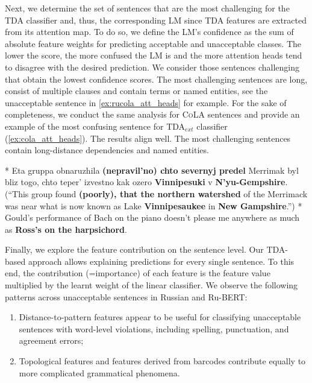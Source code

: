 \documentclass[11pt]{article}
\begin{document}
Next, we determine the set of sentences that are the most challenging for the TDA classifier and, thus, the corresponding LM since TDA features are extracted from its attention map. 
To do so, we define the LM's confidence as the sum of absolute feature weights for predicting acceptable and unacceptable classes. The lower the score, the more confused the LM is and the more attention heads tend to disagree with the desired prediction.  
We consider those sentences challenging that obtain the lowest confidence scores. 
The most challenging sentences are long, consist of multiple clauses and contain terms or named entities, see the unacceptable sentence in \ref{ex:rucola_att_heads} for example.
For the sake of completeness, we conduct the same analysis for \textsc{CoLA} sentences and provide an example of the most confusing sentence for TDA$_{ext}$ classifier (\ref{ex:cola_att_heads}). The results align well. The most challenging sentences contain long-distance dependencies and named entities.
\begin{exe}
\ex \label{ex:rucola_att_heads} * Eta gruppa obnaruzhila \textbf{(nepravil'no) chto severnyj predel} Merrimak byl bliz togo, chto teper' izvestno kak ozero \textbf{Vinnipesuki} v \textbf{N'yu-Gempshire}.\\ 
(``This group found \textbf{(poorly), that the northern watershed} of the Merrimack was near what is now known as Lake \textbf{Vinnipesaukee} in \textbf{New Gampshire}.'')
\ex\label{ex:cola_att_heads} * Gould's performance of Bach on the piano doesn't please me anywhere as much as \textbf{Ross's on the harpsichord}.


\end{exe}

Finally,  we explore the feature contribution on the sentence level.
Our TDA-based approach allows explaining predictions for every single sentence. 
To this end, the contribution (=importance) of each feature is the feature value multiplied by the learnt weight of the linear classifier. 
We observe the following patterns across unacceptable sentences in Russian and Ru-BERT:
\begin{enumerate}
    \item Distance-to-pattern features appear to be useful for classifying unacceptable sentences with word-level violations, including spelling, punctuation, and agreement errors;
    \item Topological features and features derived from barcodes contribute equally to more complicated grammatical phenomena.
\end{enumerate}
\end{document}
